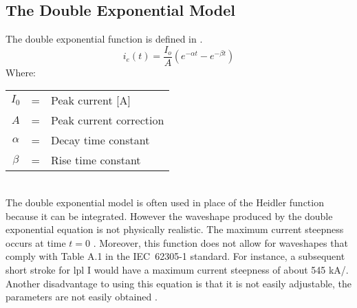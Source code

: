 \subsection{The Double Exponential Model}
\label{sub:background_double_exponential}
The double exponential function is defined in .
\begin{equation}
    i_e \left( t \right) = \frac{I_o}{A}\left( e^{-\alpha t} - e^{-\beta t} \right)
    \label{eqn:dexp}
\end{equation}
Where: \\
\begin{tabular}{cll}
    $I_0$ & = & Peak current [A] \\
    $A$ & = & Peak current correction \\
    $\alpha$ & = & Decay time constant \\
    $\beta$ & = & Rise time constant
\end{tabular}\\
The double exponential model is often used in place of the Heidler function because it can be integrated. However the waveshape produced by the double exponential equation is not physically realistic. The maximum current steepness occurs at time $t=0$ \cite{ZhangFeizhouandLiuShanghe2002,Lovric2013,Heidler2002,Delfino2012}. Moreover, this function does not allow for waveshapes that comply with Table A.1 in the IEC~62305-1 standard. For instance, a subsequent short stroke for \gls{lpl} I would have a maximum current steepness of about 545 kA/\usec \cite{Heidler2008}. Another disadvantage to using this equation is that it is not easily adjustable, the parameters are not easily obtained \cite{Javor2011}.

